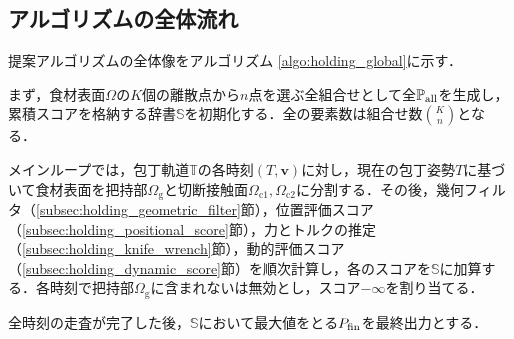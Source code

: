 \subsection{アルゴリズムの全体流れ}
\label{subsec:holding_algorithm_flow}

提案アルゴリズムの全体像をアルゴリズム \ref{algo:holding_global}に示す．

まず，食材表面$\Omega$の$K$個の離散点から$n$点を選ぶ全組合せとして全{\nameholdingpointset}$\mathbb{P}_{\mathrm{all}}$を生成し，累積スコアを格納する辞書$\mathbb{S}$を初期化する．全{\nameholdingpointset}の要素数は組合せ数$\binom{K}{n}$となる．

メインループでは，包丁軌道$\mathbb{T}$の各時刻$(T,\bm{v})$に対し，現在の包丁姿勢$T$に基づいて食材表面を把持部$\Omega_{\mathrm{g}}$と切断接触面$\Omega_{\mathrm{c1}},\Omega_{\mathrm{c2}}$に分割する．その後，幾何フィルタ（\ref{subsec:holding_geometric_filter}節），位置評価スコア（\ref{subsec:holding_positional_score}節），力とトルクの推定（\ref{subsec:holding_knife_wrench}節），動的評価スコア（\ref{subsec:holding_dynamic_score}節）を順次計算し，各{\nameholdingpointset}のスコアを$\mathbb{S}$に加算する．各時刻で把持部$\Omega_{\mathrm{g}}$に含まれない{\nameholdingpointset}は無効とし，スコア$-\infty$を割り当てる．

全時刻の走査が完了した後，$\mathbb{S}$において最大値をとる{\nameholdingpointset}$\equholdingpointset[fin]$を最終出力とする．



